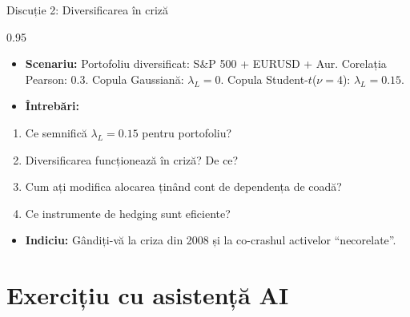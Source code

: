 \documentclass[9pt, aspectratio=169, t]{beamer}
\begin{document}
\begin{frame}{Discuție 2: Diversificarea în criză}
    \begin{cminipage}{0.95\textwidth}
    \begin{itemize}\setlength{\itemsep}{0pt}
        \item \textbf{Scenariu:} Portofoliu diversificat: S\&P 500 + EURUSD + Aur. Corelația Pearson: 0.3. Copula Gaussiană: $\lambda_L = 0$. Copula Student-$t$($\nu = 4$): $\lambda_L = 0.15$.
    \end{itemize}

    \vspace{0.3cm}
    \begin{itemize}\setlength{\itemsep}{0pt}
        \item \textbf{Întrebări:}
    \end{itemize}
    \begin{enumerate}\setlength{\itemsep}{0pt}
        \item Ce semnifică $\lambda_L = 0.15$ pentru portofoliu?
        \item Diversificarea funcționează în criză? De ce?
        \item Cum ați modifica alocarea ținând cont de dependența de coadă?
        \item Ce instrumente de hedging sunt eficiente?
    \end{enumerate}

    \vspace{0.3cm}
    \begin{itemize}\setlength{\itemsep}{0pt}
        \item \textbf{Indiciu:} Gândiți-vă la criza din 2008 și la co-crashul activelor ``necorelate''.
    \end{itemize}
    \end{cminipage}
\end{frame}

\section{Exercițiu cu asistență AI}
\end{document}
